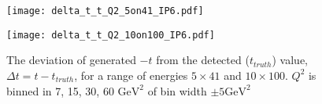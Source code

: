 \begin{figure}
  \centering
  \begin{minipage}[b]{0.48\linewidth}
    \texttt{[image: delta\_t\_t\_Q2\_5on41\_IP6.pdf]}
  \end{minipage}  
  \begin{minipage}[b]{0.48\linewidth}
    \texttt{[image: delta\_t\_t\_Q2\_10on100\_IP6.pdf]}
  \end{minipage}
  
  \caption{The deviation of generated $-t$ from the detected ($t_{truth}$) value, $\Delta{t}=t-t_{truth}$, for a range of energies $5\times41$ and $10\times100$. $Q^2$ is binned in 7, 15, 30, 60 $\mathrm{GeV}^2$ of bin width $\pm5\mathrm{GeV}^2$}
  \label{fig:delta_t_t_Q2_IP6}
\end{figure}

